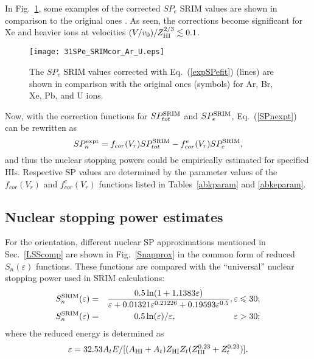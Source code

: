 \documentclass[aps,pra,twocolumn,amsmath,amssymb,floatfix]{revtex4-2}
\begin{document}
In Fig.~\ref{SPecorr}, some examples of the corrected $SP_{e}$ SRIM values are shown in comparison to the original ones \cite{SRIM}. As seen, the corrections become significant for Xe and heavier ions at velocities $(V/v_{0})/Z_{\rm HI}^{2/3} \lesssim 0.1 $.

\begin{figure}[!h]  %
\begin{center}
\texttt{[image: 31SPe\_SRIMcor\_Ar\_U.eps]}
\caption{\label{SPecorr}The $SP_{e}$ SRIM values corrected with Eq.~(\ref{expSPefit}) (lines) are shown in comparison with the original ones \cite{SRIM} (symbols) for Ar, Br, Xe, Pb, and U ions.}
\end{center}
\end{figure}

Now, with the correction functions for $SP_{tot}^{\rm SRIM}$ and $SP_{e}^{\rm SRIM}$, Eq.~(\ref{SPnexpt}) can be rewritten as
\begin{equation}
  SP_{n}^{\rm expt} = f_{cor}(V_{r}) SP_{tot}^{\rm SRIM} - f_{cor}^{e}(V_{r})SP_{e}^{\rm SRIM},          \label{SPnex}
\end{equation}
and thus the nuclear stopping powers could be empirically estimated for specified HIs. Respective SP values are  determined by the parameter values of the $f_{cor}(V_{r})$ and $f_{cor}^{e}(V_{r})$ functions listed in Tables~\ref{abkparam} and \ref{abkeparam}.


\subsection{\label{SPnest}Nuclear stopping power estimates}

For the orientation, different nuclear SP approximations mentioned in Sec.~\ref{LSScomp} are shown in Fig.~\ref{Snapprox} in the common form of reduced $S_{n}(\varepsilon)$ functions. These functions are compared with the ``universal'' nuclear stopping power used in SRIM calculations:
\begin{eqnarray}\label{SnSRIM}
  S_{n}^{\rm SRIM}(\varepsilon) & = & \frac{0.5\ln(1 + 1.1383 \varepsilon)}{\varepsilon + 0.01321\varepsilon^{0.21226} + 0.19593\varepsilon^{0.5}}, \varepsilon \leqslant 30;  \nonumber \\
  S_{n}^{\rm SRIM}(\varepsilon) & = & 0.5 \ln(\varepsilon)/\varepsilon, \phantom{3.5 \ln(\varepsilon)/\varepsilon\ln(\varepsilon)} \varepsilon > 30;
\end{eqnarray}
where the reduced energy is determined as
\begin{equation}\label{epsSRIM}
  \varepsilon = 32.53A_{t}E/[(A_{\rm HI}+A_{t})Z_{\rm HI}Z_{t}(Z_{\rm HI}^{0.23}+Z_{t}^{0.23})].
\end{equation}
\end{document}
